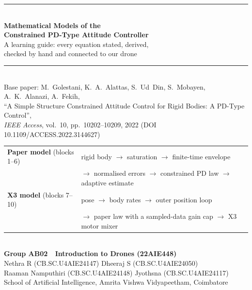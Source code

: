 \documentclass[11pt,a4paper]{article}
\begin{document}
\begin{titlepage}
  \centering
  \vspace*{1.3cm}
  {\color{cHead}\rule{\linewidth}{1.2pt}}\\[14pt]
  {\Huge\sffamily\bfseries\color{cHead} Mathematical Models of the\\[4pt] Constrained PD-Type Attitude Controller\\[8pt]}
  {\Large\sffamily\color{cText} A learning guide: every equation stated, derived,\\ checked by hand and connected to our drone\\[10pt]}
  {\color{cHead}\rule{\linewidth}{1.2pt}}\\[20pt]
  {\large\sffamily Base paper: M.~Golestani, K.~A.~Alattas, S.~Ud~Din, S.~Mobayen, A.~K.~Alanazi, A.~Fekih,\\
   ``A Simple Structure Constrained Attitude Control for Rigid Bodies: A PD-Type Control'',\\
   \emph{IEEE Access}, vol.~10, pp.~10202--10209, 2022 (DOI 10.1109/ACCESS.2022.3144627)\\[18pt]}
  \begin{minipage}{0.98\linewidth}\centering\small
  \begin{tabular}{ll}
    \toprule
    \textbf{Paper model} (blocks 1--6) & rigid body $\rightarrow$ saturation $\rightarrow$ finite-time envelope\\
                                       & $\rightarrow$ normalised errors $\rightarrow$ constrained PD law $\rightarrow$ adaptive estimate\\[3pt]
    \textbf{X3 model} (blocks 7--10)   & pose $\rightarrow$ body rates $\rightarrow$ outer position loop\\
                                       & $\rightarrow$ paper law with a sampled-data gain cap $\rightarrow$ X3 motor mixer\\
    \bottomrule
  \end{tabular}
  \end{minipage}\\[26pt]
  {\large\sffamily\bfseries Group AB02 \,\textbullet\, Introduction to Drones (22AIE448)}\\[6pt]
  {\sffamily Nethra R (CB.SC.U4AIE24147) \;\textbullet\; Dheeraj S (CB.SC.U4AIE24050)\\
   Raaman Namputhiri (CB.SC.U4AIE24148) \;\textbullet\; Jyothsna (CB.SC.U4AIE24117)}\\[4pt]
  {\sffamily\small School of Artificial Intelligence, Amrita Vishwa Vidyapeetham, Coimbatore}

\end{titlepage}
\end{document}
